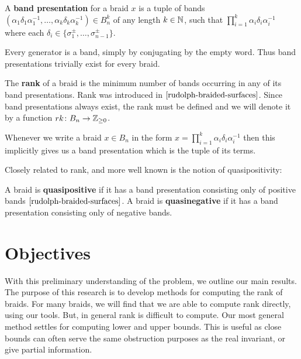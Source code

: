 \documentclass[12pt]{thesis}
\begin{document}
\begin{definition}
    A \textbf{band presentation} for a braid $x$ is a tuple of bands $(\alpha_{1}\delta_{1}\alpha_{1}^{-1},
    \ldots, \alpha_{k}\delta_{k}\alpha_{k}^{-1}) \in B_{n}^{k}$
    of any length $k \in \mathbb{N}$,
    such that $\prod_{i=1}^{k} \alpha_{i} \delta_{i} \alpha_{i}^{-1}$
    where each $\delta_{i} \in \{ \sigma_{1}^{\pm} ,\ldots, \sigma_{n-1}^{\pm} \}$.
\end{definition}

Every generator is a band, simply by conjugating by the empty word.
Thus band presentations trivially exist for every braid.
\begin{definition}
    The \textbf{rank} of a braid is the minimum number of bands
    occurring in any of its band presentations. 
    Rank was introduced in $\cite{rudolph-braided-surfaces}$.
    Since band presentations always exist,
    the rank must be defined and we will denote it by a function $rk \colon B_{n} \rightarrow \mathbb{Z}_{\geq 0}$.
\end{definition}

Whenever we write a braid $x \in B_{n}$ in the form $x = \prod_{i=1}^{k} \alpha_{i} \delta_{i} \alpha_{i}^{-1}$
then this implicitly gives us a band presentation which is the tuple of its terms.

Closely related to rank, and more well known is the notion of quasipositivity:
\begin{definition}
    A braid is \textbf{quasipositive} if it has a
    band presentation consisting only of positive bands $\cite{rudolph-braided-surfaces}$.
    A braid is \textbf{quasinegative} if it has a band
    presentation consisting only of negative bands.
\end{definition}

\section{Objectives}

With this preliminary understanding of the problem, we outline our main results.
The purpose of this research is to develop methods for computing the rank of braids.
For many braids, we will find that we are able to compute rank directly, using
our tools.
But, in general rank is difficult to compute.
Our most general method settles for computing lower and upper bounds.
This is useful
as close bounds can often serve the same obstruction
purposes as the real invariant,
or give partial information.
\end{document}
